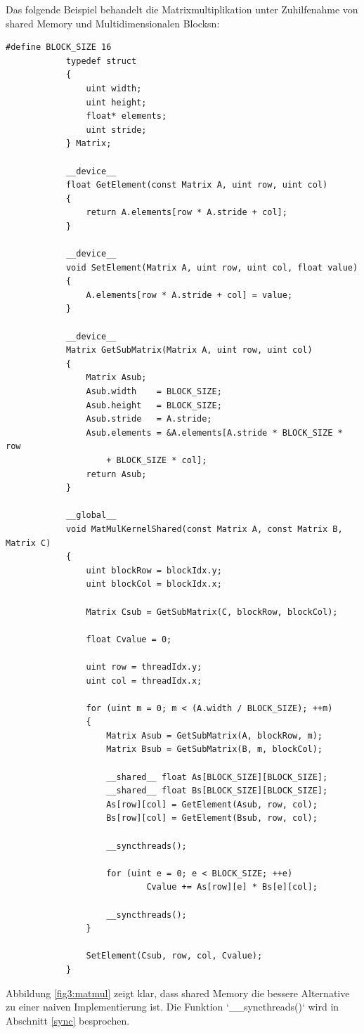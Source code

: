         Das folgende Beispiel behandelt die Matrixmultiplikation unter Zuhilfenahme von \gls{shared Memory} und Multidimensionalen \Glspl{Block}n:       
        \begin{lstlisting}[caption=Matrixmultiplikation]
			#define BLOCK_SIZE 16 	
			typedef struct
			{
				uint width;
				uint height;
				float* elements;
				uint stride;
			} Matrix;

			__device__ 
			float GetElement(const Matrix A, uint row, uint col)
			{
				return A.elements[row * A.stride + col];
			}

			__device__ 
			void SetElement(Matrix A, uint row, uint col, float value)
			{
				A.elements[row * A.stride + col] = value;
			}
			
			__device__
			Matrix GetSubMatrix(Matrix A, uint row, uint col) 
			{
				Matrix Asub;
				Asub.width    = BLOCK_SIZE;
				Asub.height   = BLOCK_SIZE;
				Asub.stride   = A.stride;
				Asub.elements = &A.elements[A.stride * BLOCK_SIZE * row 
					+ BLOCK_SIZE * col];
				return Asub;
			}	
			 
			__global__ 
			void MatMulKernelShared(const Matrix A, const Matrix B, Matrix C)
			{    
    			uint blockRow = blockIdx.y;
    			uint blockCol = blockIdx.x;

    			Matrix Csub = GetSubMatrix(C, blockRow, blockCol);
    
    			float Cvalue = 0;

    			uint row = threadIdx.y;
    			uint col = threadIdx.x;

    			for (uint m = 0; m < (A.width / BLOCK_SIZE); ++m)
    			{
					Matrix Asub = GetSubMatrix(A, blockRow, m);
					Matrix Bsub = GetSubMatrix(B, m, blockCol);

					__shared__ float As[BLOCK_SIZE][BLOCK_SIZE];
					__shared__ float Bs[BLOCK_SIZE][BLOCK_SIZE];
					As[row][col] = GetElement(Asub, row, col);
					Bs[row][col] = GetElement(Bsub, row, col);

					__syncthreads();

					for (uint e = 0; e < BLOCK_SIZE; ++e)
							Cvalue += As[row][e] * Bs[e][col];

					__syncthreads();
				}

				SetElement(Csub, row, col, Cvalue);
			}
        \end{lstlisting}
        
        Abbildung \ref{fig3:matmul} zeigt klar, dass \gls{shared Memory} die bessere Alternative zu einer naiven Implementierung ist. Die Funktion \li`__syncthreads()` wird in Abschnitt \ref{sync} besprochen.
        
